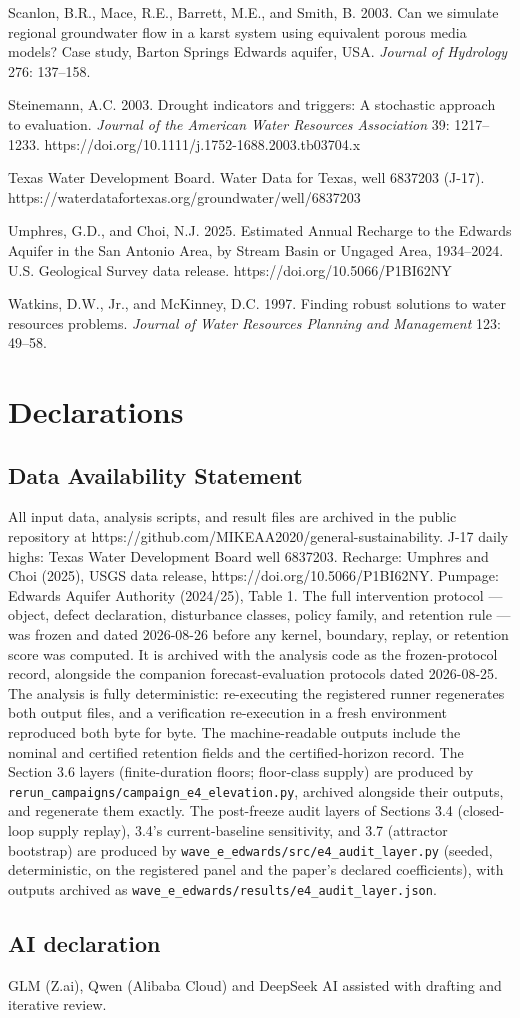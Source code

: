 \documentclass[11pt]{article}
\begin{document}
Scanlon, B.R., Mace, R.E., Barrett, M.E., and Smith, B. 2003. Can we
simulate regional groundwater flow in a karst system using equivalent
porous media models? Case study, Barton Springs Edwards aquifer, USA.
\emph{Journal of Hydrology} 276: 137--158.

Steinemann, A.C. 2003. Drought indicators and triggers: A stochastic
approach to evaluation. \emph{Journal of the American Water Resources
Association} 39: 1217--1233.
https://doi.org/10.1111/j.1752-1688.2003.tb03704.x

Texas Water Development Board. Water Data for Texas, well 6837203
(J-17). https://waterdatafortexas.org/groundwater/well/6837203

Umphres, G.D., and Choi, N.J. 2025. Estimated Annual Recharge to the
Edwards Aquifer in the San Antonio Area, by Stream Basin or Ungaged
Area, 1934--2024. U.S. Geological Survey data release.
https://doi.org/10.5066/P1BI62NY

Watkins, D.W., Jr., and McKinney, D.C. 1997. Finding robust solutions to
water resources problems. \emph{Journal of Water Resources Planning and
Management} 123: 49--58.

\section*{Declarations}

\subsection*{Data Availability Statement}

All input data, analysis scripts, and result files are archived in the
public repository at
https://github.com/MIKEAA2020/general-sustainability. J-17 daily highs:
Texas Water Development Board well 6837203. Recharge: Umphres and Choi
(2025), USGS data release, https://doi.org/10.5066/P1BI62NY. Pumpage:
Edwards Aquifer Authority (2024/25), Table 1. The full intervention
protocol --- object, defect declaration, disturbance classes, policy
family, and retention rule --- was frozen and dated 2026-08-26 before
any kernel, boundary, replay, or retention score was computed. It is
archived with the analysis code as the frozen-protocol record, alongside
the companion forecast-evaluation protocols dated 2026-08-25. The
analysis is fully deterministic: re-executing the registered runner
regenerates both output files, and a verification re-execution in a
fresh environment reproduced both byte for byte. The machine-readable
outputs include the nominal and certified retention fields and the
certified-horizon record. The Section 3.6 layers (finite-duration
floors; floor-class supply) are produced by
\texttt{rerun\_campaigns/campaign\_e4\_elevation.py}, archived alongside
their outputs, and regenerate them exactly. The post-freeze audit layers
of Sections 3.4 (closed-loop supply replay), 3.4's current-baseline
sensitivity, and 3.7 (attractor bootstrap) are produced by
\texttt{wave\_e\_edwards/src/e4\_audit\_layer.py} (seeded,
deterministic, on the registered panel and the paper's declared
coefficients), with outputs archived as
\texttt{wave\_e\_edwards/results/e4\_audit\_layer.json}.

\subsection*{AI declaration}
GLM (Z.ai), Qwen (Alibaba Cloud) and DeepSeek AI assisted with drafting and iterative review.
\end{document}
